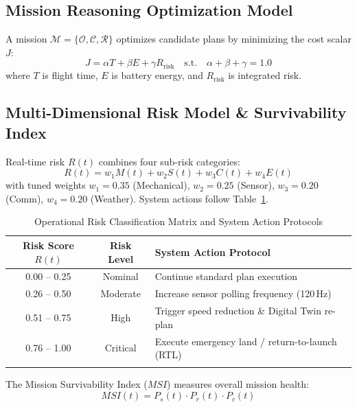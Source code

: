 \documentclass[pdflatex,sn-mathphys-num]{sn-jnl}%
\theoremstyle{thmstyleone}%
\theoremstyle{thmstyletwo}%
\theoremstyle{thmstylethree}%
\begin{document}
\subsection{Mission Reasoning Optimization Model}
A mission $\mathcal{M} = \{\mathcal{O}, \mathcal{C}, \mathcal{R}\}$ optimizes candidate plans by minimizing the cost scalar $J$:
\begin{equation}
J = \alpha T + \beta E + \gamma R_{\text{risk}} \quad \text{s.t.} \quad \alpha + \beta + \gamma = 1.0
\label{eq:cost_function}
\end{equation}
where $T$ is flight time, $E$ is battery energy, and $R_{\text{risk}}$ is integrated risk.

\subsection{Multi-Dimensional Risk Model \& Survivability Index}
Real-time risk $R(t)$ combines four sub-risk categories:
\begin{equation}
R(t) = w_1 M(t) + w_2 S(t) + w_3 C(t) + w_4 E(t)
\label{eq:risk_score}
\end{equation}
with tuned weights $w_1 = 0.35$ (Mechanical), $w_2 = 0.25$ (Sensor), $w_3 = 0.20$ (Comm), $w_4 = 0.20$ (Weather). System actions follow Table~\ref{tab:risk_matrix}.

\begin{table}[h]
\caption{Operational Risk Classification Matrix and System Action Protocols}
\label{tab:risk_matrix}
\centering
\begin{tabular}{ccl}
\toprule
Risk Score $R(t)$ & Risk Level & System Action Protocol \\
\midrule
0.00 -- 0.25 & Nominal & Continue standard plan execution \\
0.26 -- 0.50 & Moderate & Increase sensor polling frequency (120\,Hz) \\
0.51 -- 0.75 & High & Trigger speed reduction \& Digital Twin re-plan \\
0.76 -- 1.00 & Critical & Execute emergency land / return-to-launch (RTL) \\
\botrule
\end{tabular}
\end{table}

The Mission Survivability Index ($MSI$) measures overall mission health:
\begin{equation}
MSI(t) = P_s(t) \cdot P_r(t) \cdot P_c(t)
\label{eq:msi}
\end{equation}
\end{document}
